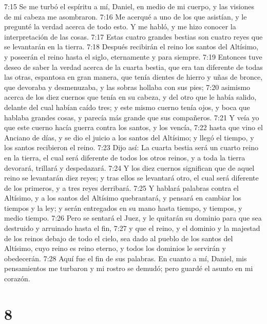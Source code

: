 7:15 Se me turbó el espíritu a mí, Daniel, en medio de mi cuerpo, y las visiones de mi cabeza me asombraron.  
7:16 Me acerqué a uno de los que asistían, y le pregunté la verdad acerca de todo esto. Y me habló, y me hizo conocer la interpretación de las cosas.  
7:17 Estas cuatro grandes bestias son cuatro reyes que se levantarán en la tierra.  
7:18 Después recibirán el reino los santos del Altísimo, y poseerán el reino hasta el siglo, eternamente y para siempre. 
7:19 Entonces tuve deseo de saber la verdad acerca de la cuarta bestia, que era tan diferente de todas las otras, espantosa en gran manera, que tenía dientes de hierro y uñas de bronce, que devoraba y desmenuzaba, y las sobras hollaba con sus pies;  
7:20 asimismo acerca de los diez cuernos que tenía en su cabeza, y del otro que le había salido, delante del cual habían caído tres; y este mismo cuerno tenía ojos, y boca que hablaba grandes cosas, y parecía más grande que sus compañeros.  
7:21 Y veía yo que este cuerno hacía guerra contra los santos, y los vencía, 
7:22 hasta que vino el Anciano de días, y se dio el juicio a los santos del Altísimo;  y llegó el tiempo, y los santos recibieron el reino.  
7:23 Dijo así: La cuarta bestia será un cuarto reino en la tierra, el cual será diferente de todos los otros reinos, y a toda la tierra devorará, trillará y despedazará.  
7:24 Y los diez cuernos significan que de aquel reino se levantarán diez reyes; y tras ellos se levantará otro, el cual será diferente de los primeros, y a tres reyes derribará.  
7:25 Y hablará palabras contra el Altísimo, y a los santos del Altísimo quebrantará, y pensará en cambiar los tiempos y la ley; y serán entregados en su mano hasta tiempo, y tiempos, y medio tiempo. 
7:26 Pero se sentará el Juez, y le quitarán su dominio para que sea destruido y arruinado hasta el fin,  
7:27 y que el reino, y el dominio y la majestad de los reinos debajo de todo el cielo, sea dado al pueblo de los santos del Altísimo,  cuyo reino es reino eterno, y todos los dominios le servirán y obedecerán.  
7:28 Aquí fue el fin de sus palabras. En cuanto a mí, Daniel, mis pensamientos me turbaron y mi rostro se demudó; pero guardé el asunto en mi corazón.  

\chapter{8}

